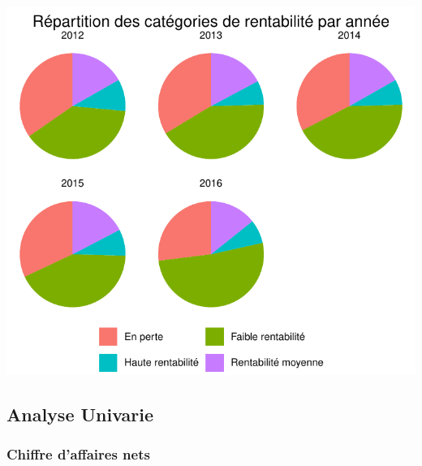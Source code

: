 \documentclass[mstat,12pt]{unswthesis}
\begin{document}
\medskip

\includegraphics{TDDT_projet_L_2_files/figure-latex/rentabilite-1.pdf}

\newpage

\subsection{Analyse Univarie}\label{analyse-univarie}

\medskip

\subsubsection{Chiffre d'affaires nets}\label{chiffre-daffaires-nets}
\end{document}

